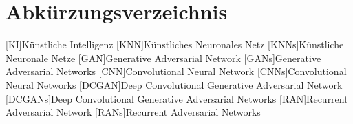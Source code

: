 \chapter*{Abkürzungsverzeichnis} 
\begin{acronym}
[KI]{Künstliche Intelligenz}
[KNN]{Künstliches Neuronales Netz}
[KNNs]{Künstliche Neuronale Netze}
[GAN]{Generative Adversarial Network}
[GANs]{Generative Adversarial Networks}
[CNN]{Convolutional Neural Network}
[CNNs]{Convolutional Neural Networks}
[DCGAN]{Deep Convolutional Generative Adversarial Network}
[DCGANs]{Deep Convolutional Generative Adversarial Networks}
[RAN]{Recurrent Adversarial Network}
[RANs]{Recurrent Adversarial Networks}
\end{acronym}
